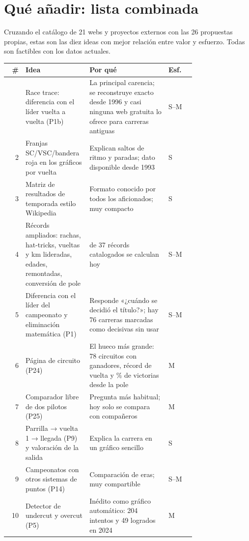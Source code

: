 \documentclass[11pt,openany]{report}
\begin{document}
\section*{Qué añadir: lista combinada}

Cruzando el catálogo de 21 webs y proyectos externos con las 26 propuestas propias, estas son las
diez ideas con mejor relación entre valor y esfuerzo. Todas son factibles con los datos actuales.

\begin{center}\small
\begin{longtable}{@{}r>{\raggedright\arraybackslash}p{0.34\linewidth}>{\raggedright\arraybackslash}p{0.42\linewidth}l@{}}
\toprule
\textbf{\#} & \textbf{Idea} & \textbf{Por qué} & \textbf{Esf.} \\
\midrule\endhead
\bottomrule\endlastfoot
1 & Race trace: diferencia con el líder vuelta a vuelta (P1b) & La principal carencia; se reconstruye exacto desde 1996 y casi ninguna web gratuita lo ofrece para carreras antiguas & S–M \\
2 & Franjas SC/VSC/bandera roja en los gráficos por vuelta & Explican saltos de ritmo y paradas; dato disponible desde 1993 & S \\
3 & Matriz de resultados de temporada estilo Wikipedia & Formato conocido por todos los aficionados; muy compacto & S \\
4 & Récords ampliados: rachas, hat-tricks, vueltas y km lideradas, edades, remontadas, conversión de pole & 35 de 37 récords catalogados se calculan hoy & S–M \\
5 & Diferencia con el líder del campeonato y eliminación matemática (P1) & Responde «¿cuándo se decidió el título?»; hay 76 carreras marcadas como decisivas sin usar & S–M \\
6 & Página de circuito (P24) & El hueco más grande: 78 circuitos con ganadores, récord de vuelta y \% de victorias desde la pole & M \\
7 & Comparador libre de dos pilotos (P25) & Pregunta más habitual; hoy solo se compara con compañeros & M \\
8 & Parrilla → vuelta 1 → llegada (P9) y valoración de la salida & Explica la carrera en un gráfico sencillo & S \\
9 & Campeonatos con otros sistemas de puntos (P14) & Comparación de eras; muy compartible & S–M \\
10 & Detector de undercut y overcut (P5) & Inédito como gráfico automático: 204 intentos y 49 logrados en 2024 & M \\
\end{longtable}
\end{center}
\end{document}
